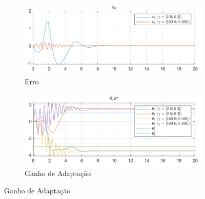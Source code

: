 \documentclass[10pt]{article}
\begin{document}
\begin{figure}[h!]
    \centering
    \begin{subfigure}[b]{0.45\textwidth}
        \centering
        \includegraphics[width=\textwidth]{img/fig01a.png}
        \caption{Erro}
    \end{subfigure}
    \begin{subfigure}[b]{0.45\textwidth}
        \centering
        \includegraphics[width=\textwidth]{img/fig01b.png}
        \caption{Ganho de Adaptação}
    \end{subfigure}

    \vspace{0.5cm}


\end{figure}
\end{document}
